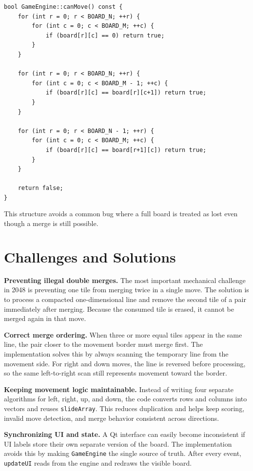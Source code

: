 \documentclass[a4paper,12pt]{article}
\begin{document}
\begin{lstlisting}[style=CppStyle,caption={Loss-condition helper}]
bool GameEngine::canMove() const {
    for (int r = 0; r < BOARD_N; ++r) {
        for (int c = 0; c < BOARD_M; ++c) {
            if (board[r][c] == 0) return true;
        }
    }

    for (int r = 0; r < BOARD_N; ++r) {
        for (int c = 0; c < BOARD_M - 1; ++c) {
            if (board[r][c] == board[r][c+1]) return true;
        }
    }

    for (int r = 0; r < BOARD_N - 1; ++r) {
        for (int c = 0; c < BOARD_M; ++c) {
            if (board[r][c] == board[r+1][c]) return true;
        }
    }

    return false;
}
\end{lstlisting}

This structure avoids a common bug where a full board is treated as lost even though a merge is still possible.

\section{Challenges and Solutions}

\textbf{Preventing illegal double merges.} The most important mechanical challenge in 2048 is preventing one tile from merging twice in a single move. The solution is to process a compacted one-dimensional line and remove the second tile of a pair immediately after merging. Because the consumed tile is erased, it cannot be merged again in that move.

\textbf{Correct merge ordering.} When three or more equal tiles appear in the same line, the pair closer to the movement border must merge first. The implementation solves this by always scanning the temporary line from the movement side. For right and down moves, the line is reversed before processing, so the same left-to-right scan still represents movement toward the border.

\textbf{Keeping movement logic maintainable.} Instead of writing four separate algorithms for left, right, up, and down, the code converts rows and columns into vectors and reuses \texttt{slideArray}. This reduces duplication and helps keep scoring, invalid move detection, and merge behavior consistent across directions.

\textbf{Synchronizing UI and state.} A Qt interface can easily become inconsistent if UI labels store their own separate version of the board. The implementation avoids this by making \texttt{GameEngine} the single source of truth. After every event, \texttt{updateUI} reads from the engine and redraws the visible board.
\end{document}
